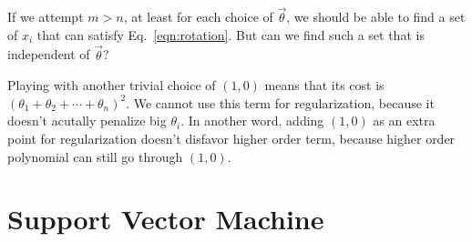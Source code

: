 If we attempt $m>n$, at least for each choice of $\vec\theta$, we should be able to find a set of $x_i$ that can satisfy Eq.~\ref{eqn:rotation}. But can we find such a set that is independent of $\vec\theta$?

Playing with another trivial choice of $(1, 0)$ means that its cost is $(\theta_1 + \theta_2 + \cdots + \theta_n)^2$. We cannot use this term for regularization, because it doesn't acutally penalize big $\theta_i$. In another word, adding $(1, 0)$ as an extra point for regularization doesn't disfavor higher order term, because higher order polynomial can still go through $(1,0)$.

\section{Support Vector Machine}
